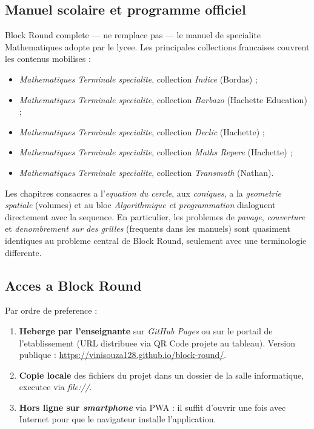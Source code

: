 \documentclass[12pt,a4paper]{scrartcl}
\begin{document}
\subsection{Manuel scolaire et programme officiel}\label{sec:pnld}

Block Round complete --- ne remplace pas --- le manuel de specialite Mathematiques adopte par le lycee. Les principales collections francaises couvrent les contenus mobilises :

\begin{itemize}[leftmargin=1.3em,itemsep=0.1em,topsep=0.2em,nosep]
  \item \emph{Mathematiques Terminale specialite}, collection \emph{Indice} (Bordas) ;
  \item \emph{Mathematiques Terminale specialite}, collection \emph{Barbazo} (Hachette Education) ;
  \item \emph{Mathematiques Terminale specialite}, collection \emph{Declic} (Hachette) ;
  \item \emph{Mathematiques Terminale specialite}, collection \emph{Maths Repere} (Hachette) ;
  \item \emph{Mathematiques Terminale specialite}, collection \emph{Transmath} (Nathan).
\end{itemize}

Les chapitres consacres a l'\emph{equation du cercle}, aux \emph{coniques}, a la \emph{geometrie spatiale} (volumes) et au bloc \emph{Algorithmique et programmation} dialoguent directement avec la sequence. En particulier, les problemes de \emph{pavage}, \emph{couverture} et \emph{denombrement sur des grilles} (frequents dans les manuels) sont quasiment identiques au probleme central de Block Round, seulement avec une terminologie differente.

\subsection{Acces a Block Round}

Par ordre de preference :

\begin{enumerate}[leftmargin=1.5em,itemsep=0.15em,topsep=0.3em]
  \item \textbf{Heberge par l'enseignant\textperiodcentered e} sur \emph{GitHub Pages} ou sur le portail de l'etablissement (URL distribuee via QR Code projete au tableau). Version publique : \url{https://vinisouza128.github.io/block-round/}.
  \item \textbf{Copie locale} des fichiers du projet dans un dossier de la salle informatique, executee via \emph{file://}.
  \item \textbf{Hors ligne sur \emph{smartphone}} via PWA : il suffit d'ouvrir une fois avec Internet pour que le navigateur installe l'application.
\end{enumerate}
\end{document}
